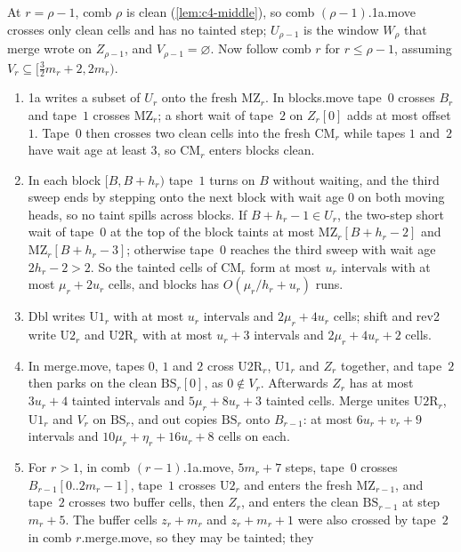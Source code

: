 \begin{informalproof}
At $r=\rho-1$, comb $\rho$ is clean (\cref{lem:c4-middle}), so comb $(\rho-1)$.1a.move crosses only clean cells and has no tainted step;
$U_{\rho-1}$ is the window $W_\rho$ that merge wrote on $Z_{\rho-1}$, and $V_{\rho-1}=\varnothing$. Now follow comb $r$ for $r\le\rho-1$,
assuming $V_r\subseteq[\frac32m_r+2,2m_r)$.
\begin{enumerate}[label=(\arabic*)]
\item 1a writes a subset of $U_r$ onto the fresh $\mathrm{MZ}_r$. In blocks.move tape~$0$ crosses $B_r$ and tape~$1$ crosses
$\mathrm{MZ}_r$; a short wait of tape~$2$ on $Z_r[0]$ adds at most offset $1$. Tape~$0$ then crosses two clean cells into the fresh
$\mathrm{CM}_r$ while tapes $1$ and~$2$ have wait age at least $3$, so $\mathrm{CM}_r$ enters blocks clean.
\item In each block $[B,B+h_r)$ tape~$1$ turns on $B$ without waiting, and the third sweep ends by stepping onto the next block with
wait age $0$ on both moving heads, so no taint spills across blocks. If $B+h_r-1\in U_r$, the two-step short wait of tape~$0$ at the top
of the block taints at most $\mathrm{MZ}_r[B+h_r-2]$ and $\mathrm{MZ}_r[B+h_r-3]$; otherwise tape~$0$ reaches the third sweep with wait
age $2h_r-2>2$. So the tainted cells of $\mathrm{CM}_r$ form at most $u_r$ intervals with at most $\mu_r+2u_r$ cells, and blocks has
$O(\mu_r/h_r+u_r)$ runs.
\item Dbl writes $\mathrm{U1}_r$ with at most $u_r$ intervals and $2\mu_r+4u_r$ cells; shift and rev2 write $\mathrm{U2}_r$ and
$\mathrm{U2R}_r$ with at most $u_r+3$ intervals and $2\mu_r+4u_r+2$ cells.
\item In merge.move, tapes $0$, $1$ and $2$ cross $\mathrm{U2R}_r$, $\mathrm{U1}_r$ and $Z_r$ together, and tape~$2$ then parks on the
clean $\mathrm{BS}_r[0]$, as $0\notin V_r$. Afterwards $Z_r$ has at most $3u_r+4$ tainted intervals and $5\mu_r+8u_r+3$ tainted cells.
Merge unites $\mathrm{U2R}_r$, $\mathrm{U1}_r$ and $V_r$ on $\mathrm{BS}_r$, and out copies $\mathrm{BS}_r$ onto $B_{r-1}$: at most
$6u_r+v_r+9$ intervals and $10\mu_r+\eta_r+16u_r+8$ cells on each.
\item For $r>1$, in comb $(r-1)$.1a.move, $5m_r+7$ steps, tape~$0$ crosses $B_{r-1}[0..2m_r-1]$, tape~$1$ crosses $\mathrm{U2}_r$ and
enters the fresh $\mathrm{MZ}_{r-1}$, and tape~$2$ crosses two buffer cells, then $Z_r$, and enters the clean $\mathrm{BS}_{r-1}$ at step
$m_r+5$. The buffer cells $z_r+m_r$ and $z_r+m_r+1$ were also crossed by tape~$2$ in comb $r$.merge.move, so they may be tainted; they

\end{enumerate}
\end{informalproof}
